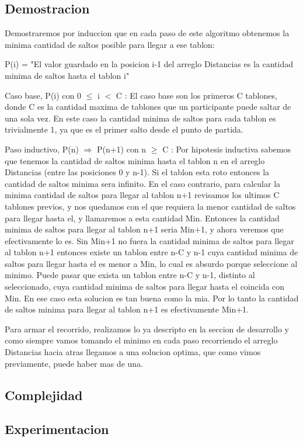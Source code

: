 \subsection{Demostracion}

Demostraremos por induccion que en cada paso de este algoritmo obtenemos la minima cantidad de saltos posible para llegar a ese tablon:

P(i) = "El valor guardado en la posicion i-1 del arreglo Distancias es la cantidad minima de saltos hasta el tablon i"

Caso base, P(i) con 0 $\leq$ i $<$ C :
El caso base son los primeros C tablones, donde C es la cantidad maxima de tablones que un participante puede saltar de una sola vez. En este caso la cantidad minima de saltos para cada tablon es trivialmente 1, ya que es el primer salto desde el punto de partida.

Paso inductivo, P(n) $ \Rightarrow $ P(n+1) con n $\geq$ C :
Por hipotesis inductiva sabemos que tenemos la cantidad de saltos minima hasta el tablon n en el arreglo Distancias (entre las posiciones 0 y n-1). Si el tablon esta roto entonces la cantidad de saltos minima sera infinito. En el caso contrario, para calcular la minima cantidad de saltos para llegar al tablon n+1 revisamos los ultimos C tablones previos, y nos quedamos con el que requiera la menor cantidad de saltos para llegar hasta el, y llamaremos a esta cantidad Min. Entonces la cantidad minima de saltos para llegar al tablon n+1 seria Min+1, y ahora veremos que efectivamente lo es.
Sin Min+1 no fuera la cantidad minima de saltos para llegar al tablon n+1 entonces existe un tablon entre n-C y n-1 cuya cantidad minima de saltos para llegar hasta el es menor a Min, lo cual es absurdo porque seleccione al minimo.
Puede pasar que exista un tablon entre n-C y n-1, distinto al seleccionado, cuya cantidad minima de saltos para llegar hasta el coincida con Min. En ese caso esta solucion es tan buena como la mia. Por lo tanto la cantidad de saltos minima para llegar al tablon n+1 es efectivamente Min+1.

Para armar el recorrido, realizamos lo ya descripto en la seccion de desarrollo y como siempre vamos tomando el minimo en cada paso recorriendo el arreglo Distancias hacia atras llegamos a una solucion optima, que como vimos previamente, puede haber mas de una. 


\subsection{Complejidad}

\subsection{Experimentacion}

  

 
